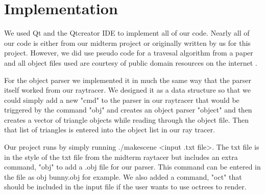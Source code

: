 \section{Implementation}

\par We used Qt and the Qtcreator IDE to implement all of our code. Nearly all of our code is either from our midterm project or originally written by us for this project. However, we did use pseudo code for a travesal algorithm from a paper \cite{traversal} and all object files used are courtesy of public domain resources on the internet \cite{cube} \cite{bunny}.
\par For the object parser we implemented it in much the same way that the parser itself worked from our raytracer. We designed it as a data structure so that we could simply add a new "cmd" to the parser in our raytracer that would be triggered by the command "obj" and creates an object parser "object" and then creates a vector of triangle objects while reading through the object file. Then that list of triangles is entered into the object list in our ray tracer.
\par Our project runs by simply running ./makescene <input .txt file>. The txt file is in the style of the txt file from the midterm raytacer but includes an extra command, "obj" to add a .obj file for our parser. This command can be entered in the file as obj bunny.obj for example. We also added a command, "oct" that should be included in the input file if the user wants to use octrees to render.





